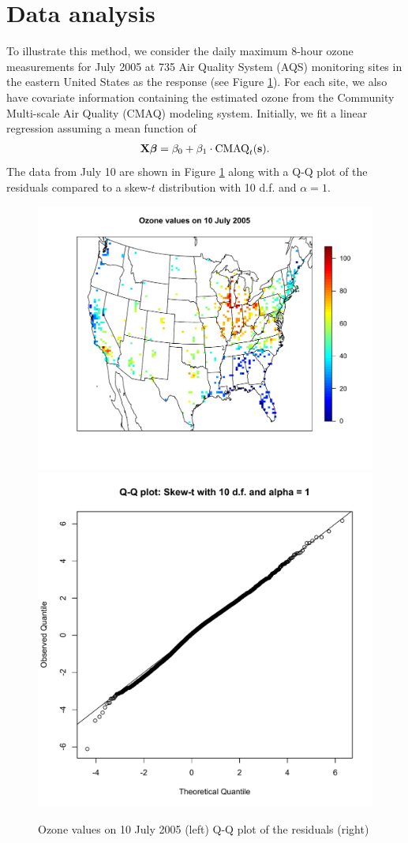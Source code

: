 \documentclass[11pt]{article}
\begin{document}
\section{Data analysis}\label{s:analysis}
To illustrate this method, we consider the daily maximum 8-hour ozone measurements for July 2005 at 735 Air Quality System (AQS) monitoring sites in the eastern United States as the response (see Figure \ref{fig:ozone}).
For each site, we also have covariate information containing the estimated ozone from the Community Multi-scale Air Quality (CMAQ) modeling system.
Initially, we fit a linear regression assuming a mean function of
\begin{align}
  \mbox{\bf X} \mbox{\boldmath $\beta$} = \beta_0 + \beta_1 \cdot \text{CMAQ}_t(\mbox{\bf s}). \label{eq:datamean}
\end{align}
The data from July 10 are shown in Figure \ref{fig:ozone} along with a Q-Q plot of the residuals compared to a skew-$t$ distribution with 10 d.f. and $\alpha = 1$.
\begin{figure}
  \centering
  \includegraphics[width=0.55\linewidth]{plots/ozone-10jul-us.pdf}
  \includegraphics[width=0.44\linewidth]{plots/qq-res.pdf}
  \caption{Ozone values on 10 July 2005 (left) Q-Q plot of the residuals (right)}
  \label{fig:ozone}
\end{figure}
\end{document}
